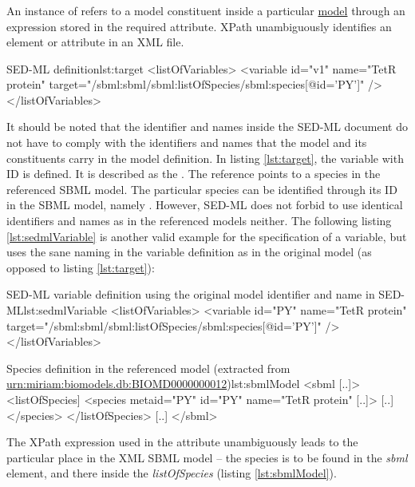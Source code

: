 \subsubsection{}
\label{sec:target}
An instance of  refers to a model constituent inside a particular \hyperref[class:model]{model} through an  expression stored in the required  attribute. 
%
XPath  unambiguously identifies an element or attribute in an XML file.

%
\begin{myXmlLst}{SED-ML  definition}{lst:target}
   <listOfVariables>
    <variable id="v1" name="TetR protein" 
     target="/sbml:sbml/sbml:listOfSpecies/sbml:species[@id='PY']" />
   </listOfVariables>
\end{myXmlLst}
%
It should be noted that the identifier and names inside the SED-ML document do not have to comply with the identifiers and names that the model and its constituents carry in the model definition. In  listing \vref{lst:target}, the variable with ID  is defined. It is described as the . The reference points to a species in the referenced SBML model. The particular species can be identified through its ID in the SBML model, namely . However, SED-ML does not forbid to use identical identifiers and names as in the referenced models neither. The following listing \vref{lst:sedmlVariable} is another valid example for the specification of a variable, but uses the sane naming in the variable definition as in the original model (as opposed to listing \ref{lst:target}):
%
\begin{myXmlLst}{SED-ML variable definition using the original model identifier and name in SED-ML}{lst:sedmlVariable}
   <listOfVariables>
    <variable id="PY" name="TetR protein" 
     target="/sbml:sbml/sbml:listOfSpecies/sbml:species[@id='PY']" />
   </listOfVariables>
\end{myXmlLst}
%

%
\begin{myXmlLst}{Species definition in the referenced model (extracted from \url{urn:miriam:biomodels.db:BIOMD0000000012})}{lst:sbmlModel}
<sbml [..]>
 <listOfSpecies]
  <species metaid="PY" id="PY" name="TetR protein" [..]>
   [..]
  </species>
 </listOfSpecies>
 [..]
</sbml>
\end{myXmlLst}
%

The XPath expression used in the  attribute unambiguously leads to the particular place in the XML SBML model -- the species is to be found in the \emph{sbml} element, and there inside the \emph{listOfSpecies} (listing \vref{lst:sbmlModel}). 
